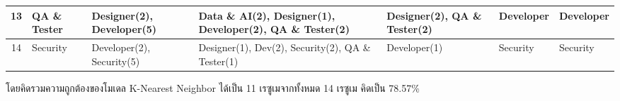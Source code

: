 \begin{table}[H]
\begin{tabularx}{\textwidth}{|c|>{\raggedright\arraybackslash}X|>{\raggedright\arraybackslash}X|>{\raggedright\arraybackslash}X|>{\raggedright\arraybackslash}X|>{\raggedright\arraybackslash}X|>{\raggedright\arraybackslash}X|}
        13                    & QA \& Tester                   & Designer(2), Developer(5)                        & Data \& AI(2), Designer(1), Developer(2), QA \& Tester(2) & Designer(2), QA \& Tester(2)       & Developer                        & Developer                              \\ \hline
        14                    & Security                       & Developer(2), Security(5)                        & Designer(1), Dev(2), Security(2), \newline QA \& Tester(1)         & Developer(1)                       & Security                         & Security                               \\ \hline
    \end{tabularx}
\end{table}
โดยคิดรวมความถูกต้องของโมเดล K-Nearest Neighbor ได้เป็น 11 เรซูเมจากทั้งหมด 14 เรซูเม คิดเป็น 78.57\%